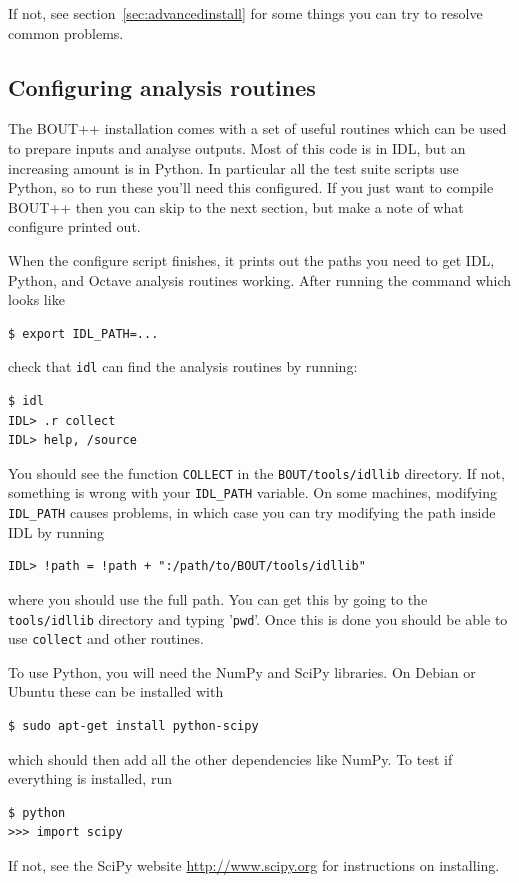 \documentclass[12pt]{article}
\begin{document}
If not, see section~\ref{sec:advancedinstall} for some things you can
try to resolve common problems.

\subsection{Configuring analysis routines}
\label{sec:configanalysis}

The BOUT++ installation comes with a set of useful routines which can
be used to prepare inputs and analyse outputs. Most of this code
is in IDL, but an increasing amount is in Python. In particular all the
test suite scripts use Python, so to run these you'll need this configured.
If you just want to compile BOUT++ then you can skip to the next section, but make a note of what configure printed out. 

When the configure script finishes, it prints out the paths you need
to get IDL, Python, and Octave analysis routines working. After running
the  command which looks like
\begin{verbatim}
$ export IDL_PATH=...
\end{verbatim}
check that \texttt{idl} can find the analysis routines by running:
\begin{verbatim}
$ idl
IDL> .r collect
IDL> help, /source
\end{verbatim}
You should see the function \texttt{COLLECT} in the \texttt{BOUT/tools/idllib} directory. If not, something is wrong with your \texttt{IDL\_PATH} variable. On some machines, modifying \texttt{IDL\_PATH} causes problems, in which case you can try modifying the path inside IDL by running
\begin{verbatim}
IDL> !path = !path + ":/path/to/BOUT/tools/idllib"
\end{verbatim}
where you should use the full path. You can get this by going to the \texttt{tools/idllib} directory and typing '\texttt{pwd}'. Once this is done you should be able to use \texttt{collect} and other routines.


To use Python, you will need the NumPy and SciPy libraries. On Debian or Ubuntu
these can be installed with
\begin{verbatim}
$ sudo apt-get install python-scipy  
\end{verbatim}
which should then add all the other dependencies like NumPy. To test if everything is installed, run
\begin{verbatim}
$ python
>>> import scipy 
\end{verbatim}
If not, see the SciPy website \url{http://www.scipy.org} for instructions
on installing. 
\end{document}
